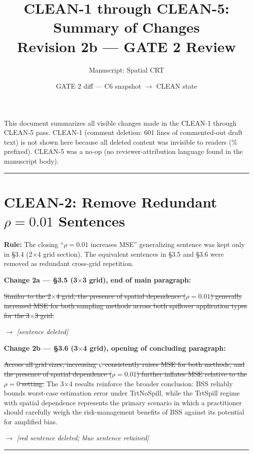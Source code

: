 \documentclass[11pt]{article}
\title{\textbf{CLEAN-1 through CLEAN-5: Summary of Changes}\\
\large Revision 2b --- GATE 2 Review}
\author{Manuscript: Spatial CRT}
\date{GATE 2 diff — C6 snapshot $\to$ CLEAN state}
\newcommand{\DEL}[1]{{\color{red}\sout{#1}}}
\begin{document}
\maketitle

\noindent This document summarizes all visible changes made in the CLEAN-1 through CLEAN-5 pass.
CLEAN-1 (comment deletion: 601 lines of commented-out draft text) is not shown here because
all deleted content was invisible to readers (\% prefixed). CLEAN-5 was a no-op (no
reviewer-attribution language found in the manuscript body).

\hrule
\bigskip

\section*{CLEAN-2: Remove Redundant $\rho=0.01$ Sentences}

\textbf{Rule:} The closing ``$\rho=0.01$ increases MSE'' generalizing sentence was kept only
in \S3.4 (2$\times$4 grid section). The equivalent sentences in \S3.5 and \S3.6 were removed
as redundant cross-grid repetition.

\medskip
\textbf{Change 2a --- \S3.5 (3$\times$3 grid), end of main paragraph:}

\DEL{Similar to the 2$\times$4 grid, the presence of spatial dependence ($\rho=0.01$)
generally increased MSE for both sampling methods across both spillover application types
for the 3$\times$3 grid.}

$\to$ \textit{[sentence deleted]}

\medskip
\textbf{Change 2b --- \S3.6 (3$\times$4 grid), opening of concluding paragraph:}

\DEL{Across all grid sizes, increasing $\psi$ consistently raises MSE for both methods,
and the presence of spatial dependence ($\rho = 0.01$) further inflates MSE relative
to the $\rho = 0$ setting.} The 3$\times$4 results reinforce the broader conclusion:
BSS reliably bounds worst-case estimation error under TrtNoSpill, while the TrtSpill
regime with spatial dependence represents the primary scenario in which a practitioner
should carefully weigh the risk-management benefits of BSS against its potential for
amplified bias.

$\to$ \textit{[red sentence deleted; blue sentence retained]}

\bigskip
\hrule
\bigskip

\end{document}
